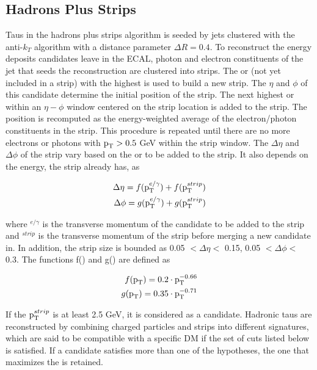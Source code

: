 \subsection{Hadrons Plus Strips}
\label{sec:tauid_hps}
Taus in the hadrons plus strips algorithm is seeded by jets clustered with the anti-$k_{T}$ algorithm with a distance parameter $\Delta R = 0.4$. To reconstruct the energy deposits \Pgpz candidates leave in the ECAL, photon and electron constituents of the jet that seeds the \tauh reconstruction are clustered into strips. The \Pe or \Pgg (not yet included in a strip) with the highest \pt is used to build a new strip. The $\eta$ and $\phi$ of this candidate determine the initial position of the strip. The next highest \pt \Pe or \Pgg within an $\eta - \phi$ window centered on the strip location is added to the strip. The position is recomputed as the energy-weighted average of the electron/photon constituents in the strip. This procedure is repeated until there are no more electrons or photons with $\text{p}_\text{T} > 0.5$ GeV within the strip window. The $\Delta \eta $ and $\Delta \phi $ of the strip vary based on the \pt or \ET to be added to the strip. It also depends on the energy, the strip already has, as
\begin{linenomath*}
  \begin{equation*}
    \begin{aligned}
      \Delta \eta = f(\text{p}_\text{T}^{e/\gamma}) + f(\text{p}_\text{T}^{strip}) \\
      \Delta \phi = g(\text{p}_\text{T}^{e/\gamma}) + g(\text{p}_\text{T}^{strip})
    \end{aligned}
  \end{equation*}
\end{linenomath*}
where \pt$^{e/\gamma}$ is the transverse momentum of the candidate to be added to the strip and \pt$^{strip}$ is the transverse momentum of the strip before merging a new candidate in. In addition, the strip size is bounded as 0.05 $< \Delta\eta <$ 0.15, 0.05 $< \Delta\phi <$ 0.3. The functions f(\pt) and g(\pt) are defined as
\begin{linenomath*}
  \begin{equation*}
    \begin{aligned}
      f(\text{p}_\text{T}) = 0.2 \cdot \text{p}_\text{T}^{-0.66} \\
      g(\text{p}_\text{T}) = 0.35 \cdot \text{p}_\text{T}^{-0.71}
    \end{aligned}
  \end{equation*}
\end{linenomath*}

If the $\text{p}_\text{T}^{strip}$ is at least 2.5 GeV, it is considered as a \Pgpz candidate. Hadronic taus are reconstructed by combining charged particles and strips into different signatures, which are said to be compatible with a specific DM if the set of cuts listed below is satisfied. If a candidate satisfies more than one of the hypotheses, the one that maximizes the \pt is retained.

